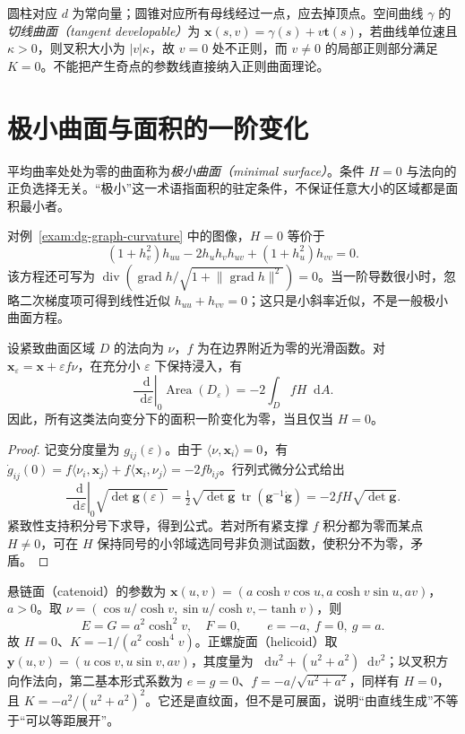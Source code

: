 \documentclass[UTF8,12pt,a4paper,fontset=fandol]{ctexbook}
\newcommand{\dd}{\mathop{}\!\mathrm d}
\newcommand{\ip}[2]{\langle #1,#2\rangle}
\newcommand{\norm}[1]{\lVert #1\rVert}
\DeclareMathOperator{\tr}{tr}
\DeclareMathOperator{\grad}{grad}
\begin{document}
圆柱对应 $d$ 为常向量；圆锥对应所有母线经过一点，应去掉顶点。空间曲线 $\gamma$ 的\emph{切线曲面（tangent developable）}为 $\mathbf x(s,v)=\gamma(s)+v\mathbf t(s)$，若曲线单位速且 $\kappa>0$，则叉积大小为 $|v|\kappa$，故 $v=0$ 处不正则，而 $v\ne0$ 的局部正则部分满足 $K=0$。不能把产生奇点的参数线直接纳入正则曲面理论。

\section{极小曲面与面积的一阶变化}
\begin{definition}[极小曲面]
平均曲率处处为零的曲面称为\emph{极小曲面（minimal surface）}。条件 $H=0$ 与法向的正负选择无关。“极小”这一术语指面积的驻定条件，不保证任意大小的区域都是面积最小者。
\end{definition}
对例~\ref{exam:dg-graph-curvature} 中的图像，$H=0$ 等价于
\begin{equation}
 (1+h_v^2)h_{uu}-2h_uh_vh_{uv}+(1+h_u^2)h_{vv}=0.
 \label{eq:dg-minimal-equation}
\end{equation}
该方程还可写为 $\operatorname{div}(\grad h/\sqrt{1+\norm{\grad h}^2})=0$。当一阶导数很小时，忽略二次梯度项可得到线性近似 $h_{uu}+h_{vv}=0$；这只是小斜率近似，不是一般极小曲面方程。

\begin{proposition}[法向变分的面积第一变分]
设紧致曲面区域 $D$ 的法向为 $\nu$，$f$ 为在边界附近为零的光滑函数。对 $\mathbf x_\varepsilon=\mathbf x+\varepsilon f\nu$，在充分小 $\varepsilon$ 下保持浸入，有
\begin{equation}
 \left.\frac{\dd}{\dd\varepsilon}\right|_{0}\operatorname{Area}(D_\varepsilon)
 =-2\int_D fH\dd A.
 \label{eq:dg-area-variation}
\end{equation}
因此，所有这类法向变分下的面积一阶变化为零，当且仅当 $H=0$。
\end{proposition}
\begin{proof}
记变分度量为 $g_{ij}(\varepsilon)$。由于 $\ip\nu{\mathbf x_i}=0$，有 $\dot g_{ij}(0)=f\ip{\nu_i}{\mathbf x_j}+f\ip{\mathbf x_i}{\nu_j}=-2fb_{ij}$。行列式微分公式给出
\[
 \left.\frac{\dd}{\dd\varepsilon}\right|_0\sqrt{\det\mathbf g(\varepsilon)}
 =\tfrac12\sqrt{\det\mathbf g}\,\tr(\mathbf g^{-1}\dot{\mathbf g})
 =-2fH\sqrt{\det\mathbf g}.
\]
紧致性支持积分号下求导，得到公式。若对所有紧支撑 $f$ 积分都为零而某点 $H\ne0$，可在 $H$ 保持同号的小邻域选同号非负测试函数，使积分不为零，矛盾。
\end{proof}

\begin{example}[悬链面与正螺旋面]\label{exam:dg-minimal-models}
悬链面（catenoid）的参数为 $\mathbf x(u,v)=(a\cosh v\cos u,a\cosh v\sin u,av)$，$a>0$。取 $\nu=(\cos u/\cosh v,\sin u/\cosh v,-\tanh v)$，则
\[
 E=G=a^2\cosh^2v,\quad F=0,\qquad e=-a,\ f=0,\ g=a.
\]
故 $H=0$、$K=-1/(a^2\cosh^4v)$。正螺旋面（helicoid）取 $\mathbf y(u,v)=(u\cos v,u\sin v,av)$，其度量为 $\dd u^2+(u^2+a^2)\dd v^2$；以叉积方向作法向，第二基本形式系数为 $e=g=0$、$f=-a/\sqrt{u^2+a^2}$，同样有 $H=0$，且 $K=-a^2/(u^2+a^2)^2$。它还是直纹面，但不是可展面，说明“由直线生成”不等于“可以等距展开”。
\end{example}
\end{document}

